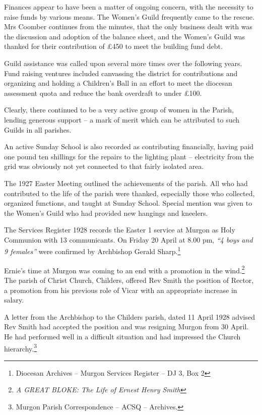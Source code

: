 Finances appear to have been a matter of ongoing concern, with the necessity to raise funds by various means. The Women's Guild frequently came to the rescue\emph{.} Mrs Coomber continues from the minutes, that the only business dealt with was the discussion and adoption of the balance sheet, and the Women's Guild was thanked for their contribution of £450 to meet the building fund debt.

Guild assistance was called upon several more times over the following years. Fund raising ventures included canvassing the district for contributions and organizing and holding a Children's Ball in an effort to meet the diocesan assessment quota and reduce the bank overdraft to under £100.

Clearly, there continued to be a very active group of women in the Parish, lending generous support -- a mark of merit which can be attributed to such Guilds in all parishes.

An active Sunday School is also recorded as contributing financially, having paid one pound ten shillings for the repairs to the lighting plant -- electricity from the grid was obviously not yet connected to that fairly isolated area.

The 1927 Easter Meeting outlined the achievements of the parish. All who had contributed to the life of the parish were thanked, especially those who collected, organized functions, and taught at Sunday School. Special mention was given to the Women's Guild who had provided new hangings and kneelers.

The Services Register 1928 records the Easter 1 service at Murgon as Holy Communion with 13 communicants. On Friday 20 April at 8.00 pm, \emph{``4 boys and 9 females''} were confirmed by Archbishop Gerald Sharp.\footnote{Diocesan Archives -- Murgon Services Register -- DJ 3, Box 2}

Ernie's time at Murgon was coming to an end with a promotion in the wind.\footnote{\emph{A GREAT BLOKE: The Life of Ernest Henry Smith}} The parish of Christ Church, Childers, offered Rev Smith the position of Rector, a promotion from his previous role of Vicar with an appropriate increase in salary.

A letter from the Archbishop to the Childers parish, dated 11 April 1928 advised Rev Smith had accepted the position and was resigning Murgon from 30 April. He had performed well in a difficult situation and had impressed the Church hierarchy.\footnote{Murgon Parish Correspondence -- ACSQ -- Archives.}

